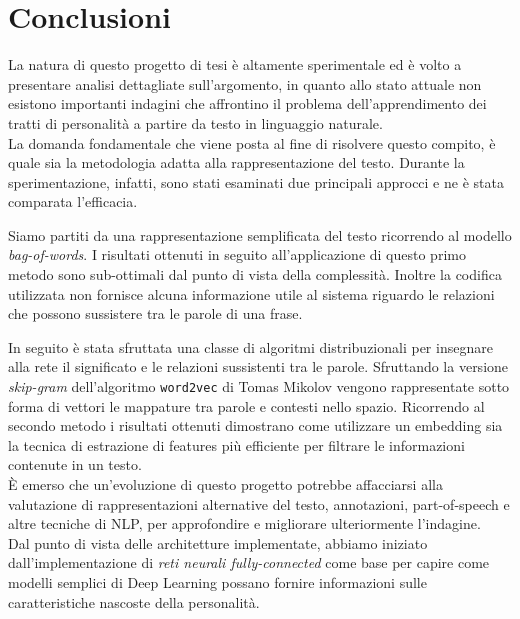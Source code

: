 \chapter{Conclusioni}
\label{chap:conclusioni}

La natura di questo progetto di tesi è altamente sperimentale ed è volto a presentare analisi dettagliate sull'argomento, in quanto allo stato attuale non esistono importanti indagini che affrontino il problema dell'apprendimento dei tratti di personalità a partire da testo in linguaggio naturale.
\\

La domanda fondamentale che viene posta al fine di risolvere questo compito, è quale sia la metodologia adatta alla rappresentazione del testo.
Durante la sperimentazione, infatti, sono stati esaminati due principali approcci e ne è stata comparata l'efficacia.

Siamo partiti da una rappresentazione semplificata del testo ricorrendo al modello \emph{bag-of-words}. 
I risultati ottenuti in seguito all'applicazione di questo primo metodo sono sub-ottimali dal punto di vista della complessità. Inoltre la codifica utilizzata non fornisce alcuna informazione utile al sistema riguardo le relazioni che possono sussistere tra le parole di una frase.

In seguito è stata sfruttata una classe di algoritmi distribuzionali per insegnare alla rete il significato e le relazioni sussistenti tra le parole. Sfruttando la versione \emph{skip-gram} dell'algoritmo \texttt{word2vec} di Tomas Mikolov vengono rappresentate sotto forma di vettori le mappature tra parole e contesti nello spazio. 
Ricorrendo al secondo metodo i risultati ottenuti dimostrano come utilizzare un embedding sia la tecnica di estrazione di features più efficiente per filtrare le informazioni contenute in un testo.\\

È emerso che un'evoluzione di questo progetto potrebbe affacciarsi alla valutazione di rappresentazioni alternative del testo, annotazioni, part-of-speech e altre tecniche di NLP, per approfondire e migliorare ulteriormente l'indagine.\\

Dal punto di vista delle architetture implementate, abbiamo iniziato dall'implementazione di \emph{reti neurali fully-connected} come base per capire come modelli semplici di Deep Learning possano fornire informazioni sulle caratteristiche nascoste della personalità. 

